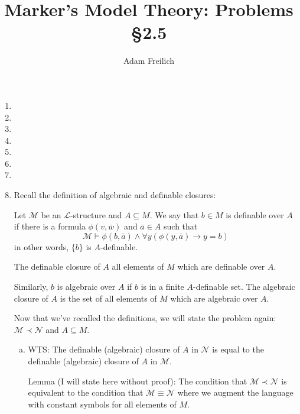 \documentclass[10pt]{article}
\author{Adam Freilich}
\title{Marker's Model Theory: Problems \S 2.5}
\newcommand{\A}{\forall}
\newcommand{\mcM}{\mathcal{M}}
\newcommand{\mcN}{\mathcal{N}}
\newcommand{\mcL}{\mathcal{L}}
\begin{document}
\maketitle


\begin{enumerate}[1.]
\item
 
\item
 
\item
 
\item
 
\item

\item
 
\item
 
\item %
Recall the definition of algebraic and definable closures:

Let \(\mcM\) be an \(\mcL\)-structure and \(A \subseteq M\). 
We say that \(b \in M\) is definable over \(A\) if there is a formula \(\phi(v, \bar{w})\) and \(\bar{a} \in A\) such that
\[\mcM \models \phi(b, \bar{a}) \land \A y (\phi(y, \bar{a}) \to y = b)\]
in other words, \(\{b\}\) is \(A\)-definable. 

The definable closure of \(A\) all elements of \(M\) which are definable over \(A\).

Similarly, \(b\) is algebraic over \(A\) if \(b\) is in a finite \(A\)-definable set. 
The algebraic closure of \(A\) is the set of all elements of \(M\) which are algebraic over \(A\).

Now that we've recalled the definitions, we will state the problem again: 
\(\mcM \prec \mcN\) and \(A \subseteq M\).
\begin{enumerate}[a)]
  \item WTS: The definable (algebraic) closure of \(A\) in \(\mcN\) is equal to the definable (algebraic) closure of \(A\) in \(\mcM\).

  Lemma (I will state here without proof): The condition that \(\mcM \prec \mcN\) is equivalent to the condition that \(\mcM \equiv \mcN\) where we augment the language with constant symbols for all elements of \(M\). 


\end{enumerate}
\end{enumerate}
\end{document}
